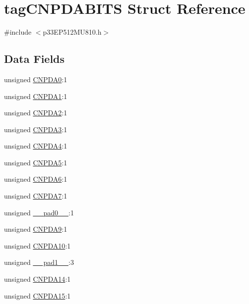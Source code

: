 \hypertarget{structtag_c_n_p_d_a_b_i_t_s}{}\section{tag\+C\+N\+P\+D\+A\+B\+I\+TS Struct Reference}
\label{structtag_c_n_p_d_a_b_i_t_s}


{\ttfamily \#include $<$p33\+E\+P512\+M\+U810.\+h$>$}

\subsection*{Data Fields}
\begin{DoxyCompactItemize}
\item 
unsigned \hyperlink{structtag_c_n_p_d_a_b_i_t_s_a76264a1658bf1833dd90a3357646ac74}{C\+N\+P\+D\+A0}\+:1
\item 
unsigned \hyperlink{structtag_c_n_p_d_a_b_i_t_s_a84c1a2744e4bcdf9159971f9bf0bb25d}{C\+N\+P\+D\+A1}\+:1
\item 
unsigned \hyperlink{structtag_c_n_p_d_a_b_i_t_s_a4bf8643155dc8dbb8b3aa373c59845af}{C\+N\+P\+D\+A2}\+:1
\item 
unsigned \hyperlink{structtag_c_n_p_d_a_b_i_t_s_ad210678f8d5c63592b386d20772990f8}{C\+N\+P\+D\+A3}\+:1
\item 
unsigned \hyperlink{structtag_c_n_p_d_a_b_i_t_s_a7c8164897da0fc875e1bfbffdc011ebd}{C\+N\+P\+D\+A4}\+:1
\item 
unsigned \hyperlink{structtag_c_n_p_d_a_b_i_t_s_a6cb1714aebae8dcf9412c674800aba8e}{C\+N\+P\+D\+A5}\+:1
\item 
unsigned \hyperlink{structtag_c_n_p_d_a_b_i_t_s_a5167096c4818625f63e6089a41b1481e}{C\+N\+P\+D\+A6}\+:1
\item 
unsigned \hyperlink{structtag_c_n_p_d_a_b_i_t_s_add60a00ef2b23ffb0d8e02eef5626f8f}{C\+N\+P\+D\+A7}\+:1
\item 
unsigned \hyperlink{structtag_c_n_p_d_a_b_i_t_s_adf71f3d8410c1f1dbbc96680a92c49af}{\+\_\+\+\_\+pad0\+\_\+\+\_\+}\+:1
\item 
unsigned \hyperlink{structtag_c_n_p_d_a_b_i_t_s_a427d50c1df140741dbc05e0d0e08da34}{C\+N\+P\+D\+A9}\+:1
\item 
unsigned \hyperlink{structtag_c_n_p_d_a_b_i_t_s_a543eede793ea293882713e1535e3f82a}{C\+N\+P\+D\+A10}\+:1
\item 
unsigned \hyperlink{structtag_c_n_p_d_a_b_i_t_s_acaf2d0924a107ec6e8d2e31febaf66f9}{\+\_\+\+\_\+pad1\+\_\+\+\_\+}\+:3
\item 
unsigned \hyperlink{structtag_c_n_p_d_a_b_i_t_s_a51c9cc978d8dce2e1d76c9d01378f886}{C\+N\+P\+D\+A14}\+:1
\item 
unsigned \hyperlink{structtag_c_n_p_d_a_b_i_t_s_a14b0390f3658912761eaf4ef96d5a7ee}{C\+N\+P\+D\+A15}\+:1
\end{DoxyCompactItemize}


